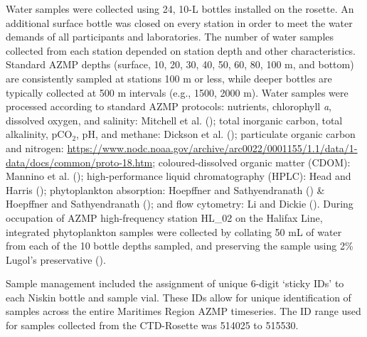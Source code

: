 \documentclass[12pt]{article}\usepackage[]{graphicx}\usepackage[]{color}
\begin{document}
Water samples were collected using 24, 10-L bottles installed on the rosette. An additional surface bottle was closed on every station in order to meet the water demands of all participants and laboratories. The number of water samples collected from each station depended on station depth and other characteristics. Standard AZMP depths (surface, 10, 20, 30, 40, 50, 60, 80, 100 m, and bottom) are consistently sampled at stations 100 m or less, while deeper bottles are typically collected at 500 m intervals (e.g., 1500, 2000 m). Water samples were processed according to standard AZMP protocols: nutrients, chlorophyll \emph{a}, dissolved oxygen, and salinity: Mitchell et al. (); total inorganic carbon, total alkalinity, pCO\(_2\), pH, and methane: Dickson et al. (); particulate organic carbon and nitrogen: \url{https://www.nodc.noaa.gov/archive/arc0022/0001155/1.1/data/1-data/docs/common/proto-18.htm}; coloured-dissolved organic matter (CDOM): Mannino et al. (); high-performance liquid chromatography (HPLC): Head and Harris (); phytoplankton absorption: Hoepffner and Sathyendranath () \& Hoepffner and Sathyendranath (); and flow cytometry: Li and Dickie (). During occupation of AZMP high-frequency station HL\_02 on the Halifax Line, integrated phytoplankton samples were collected by collating 50 mL of water from each of the 10 bottle depths sampled, and preserving the sample using 2\% Lugol's preservative ().

Sample management included the assignment of unique 6-digit `sticky IDs' to each Niskin bottle and sample vial. These IDs allow for unique identification of samples across the entire Maritimes Region AZMP timeseries. The ID range used for samples collected from the CTD-Rosette was 514025 to 515530.

\clearpage
\end{document}
